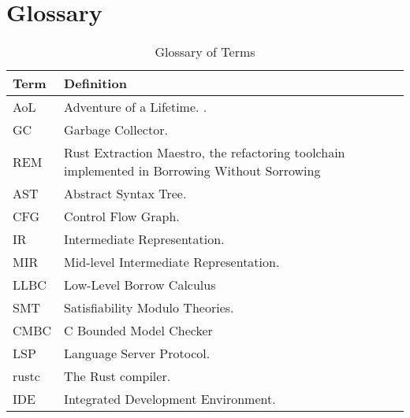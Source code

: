 \chapter*{Glossary}

\begin{table}[ht]
    \centering
    \begin{tabularx}{\textwidth}{lX}
    \toprule
    \textbf{Term} & \textbf{Definition} \\
    \midrule
    AoL   & Adventure of a Lifetime. \cite{AdventureOfALifetime}. \\
    GC    & Garbage Collector. \\
    REM   & Rust Extraction Maestro, the refactoring toolchain implemented in
    Borrowing Without Sorrowing \cite{BorrowingWithoutSorrowing} \\
    AST   & Abstract Syntax Tree. \\
    CFG   & Control Flow Graph. \\
    IR    & Intermediate Representation. \\
    MIR   & Mid-level Intermediate Representation. \\
    LLBC  & Low-Level Borrow Calculus \\
    SMT   & Satisfiability Modulo Theories. \\
    CMBC  & C Bounded Model Checker \\
    LSP   & Language Server Protocol. \\
    rustc & The Rust compiler. \\
    IDE   & Integrated Development Environment. \\

    \bottomrule
    \end{tabularx}
    \caption{Glossary of Terms}
    \label{tab:glossary}
\end{table}